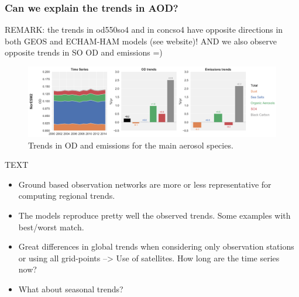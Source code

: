 \documentclass[journal abbreviation, manuscript]{copernicus}
\begin{document}
\subsubsection{Can we explain the trends in AOD?}

REMARK: the trends in od550so4 and in concso4 have opposite directions in both GEOS and ECHAM-HAM models (see website)!
AND we also observe opposite trends in SO OD and emissions =)

\begin{figure}[t]
 \includegraphics[width=12cm]{../scripts/figs/rel_species_trends.png}
 \caption{Trends in OD and emissions for the main aerosol species.}
 \label{species_abs_trends}
\end{figure}


\conclusions  %
TEXT
\begin{itemize}
 \item Ground based observation networks are more or less representative for computing regional trends.
 \item The models reproduce pretty well the observed trends. Some examples with best/worst match.
 \item Great differences in global trends when considering only observation stations or using all grid-points --> Use of satellites. How long are the time series now?
 \item What about seasonal trends?
\end{itemize}







\end{document}
